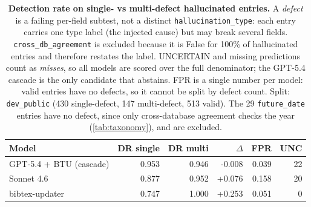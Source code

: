 \begin{table}[t]
\caption{\textbf{Detection rate on single- vs multi-defect hallucinated entries.} A \emph{defect} is a failing per-field subtest, not a distinct \texttt{hallucination\_type}: each entry carries one type label (the injected cause) but may break several fields. \texttt{cross\_db\_agreement} is excluded because it is False for 100\% of hallucinated entries and therefore restates the label. UNCERTAIN and missing predictions count as \emph{misses}, so all models are scored over the full denominator; the GPT-5.4 cascade is the only candidate that abstains. FPR is a single number per model: valid entries have no defects, so it cannot be split by defect count. Split: \texttt{dev\_public} (430 single-defect, 147 multi-defect, 513 valid). The 29 \texttt{future\_date} entries have no defect, since only cross-database agreement checks the year (\cref{tab:taxonomy}), and are excluded.}
\label{tab:multi-vs-single-defect}
\centering
\small
\begin{tabular}{lrrrrr}
\toprule
\textbf{Model} & \textbf{DR single} & \textbf{DR multi} & $\Delta$ & \textbf{FPR} & \textbf{UNC} \\
\midrule
GPT-5.4 + BTU (cascade) & 0.953 & 0.946 & -0.008 & 0.039 & 22 \\
Sonnet 4.6 & 0.877 & 0.952 & +0.076 & 0.158 & 20 \\
bibtex-updater & 0.747 & 1.000 & +0.253 & 0.051 & 0 \\
\bottomrule
\end{tabular}
\end{table}
